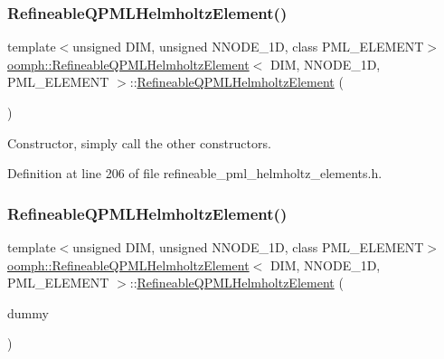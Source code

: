 \subsubsection{\texorpdfstring{Refineable\+Q\+P\+M\+L\+Helmholtz\+Element()}{RefineableQPMLHelmholtzElement()}\hspace{0.1cm}{\footnotesize\ttfamily [1/2]}}
{\footnotesize\ttfamily template$<$unsigned D\+IM, unsigned N\+N\+O\+D\+E\+\_\+1D, class P\+M\+L\+\_\+\+E\+L\+E\+M\+E\+NT$>$ \\
\hyperlink{classoomph_1_1RefineableQPMLHelmholtzElement}{oomph\+::\+Refineable\+Q\+P\+M\+L\+Helmholtz\+Element}$<$ D\+IM, N\+N\+O\+D\+E\+\_\+1D, P\+M\+L\+\_\+\+E\+L\+E\+M\+E\+NT $>$\+::\hyperlink{classoomph_1_1RefineableQPMLHelmholtzElement}{Refineable\+Q\+P\+M\+L\+Helmholtz\+Element} (\begin{DoxyParamCaption}{ }\end{DoxyParamCaption})\hspace{0.3cm}{\ttfamily [inline]}}



Constructor, simply call the other constructors. 



Definition at line 206 of file refineable\+\_\+pml\+\_\+helmholtz\+\_\+elements.\+h.

\mbox{\label{classoomph_1_1RefineableQPMLHelmholtzElement_a1276237359e84c80f372f0144bd8d672}} 
\subsubsection{\texorpdfstring{Refineable\+Q\+P\+M\+L\+Helmholtz\+Element()}{RefineableQPMLHelmholtzElement()}\hspace{0.1cm}{\footnotesize\ttfamily [2/2]}}
{\footnotesize\ttfamily template$<$unsigned D\+IM, unsigned N\+N\+O\+D\+E\+\_\+1D, class P\+M\+L\+\_\+\+E\+L\+E\+M\+E\+NT$>$ \\
\hyperlink{classoomph_1_1RefineableQPMLHelmholtzElement}{oomph\+::\+Refineable\+Q\+P\+M\+L\+Helmholtz\+Element}$<$ D\+IM, N\+N\+O\+D\+E\+\_\+1D, P\+M\+L\+\_\+\+E\+L\+E\+M\+E\+NT $>$\+::\hyperlink{classoomph_1_1RefineableQPMLHelmholtzElement}{Refineable\+Q\+P\+M\+L\+Helmholtz\+Element} (\begin{DoxyParamCaption}\item[{const \hyperlink{classoomph_1_1RefineableQPMLHelmholtzElement}{Refineable\+Q\+P\+M\+L\+Helmholtz\+Element}$<$ D\+IM, N\+N\+O\+D\+E\+\_\+1D, P\+M\+L\+\_\+\+E\+L\+E\+M\+E\+NT $>$ \&}]{dummy }\end{DoxyParamCaption})\hspace{0.3cm}{\ttfamily [inline]}}



